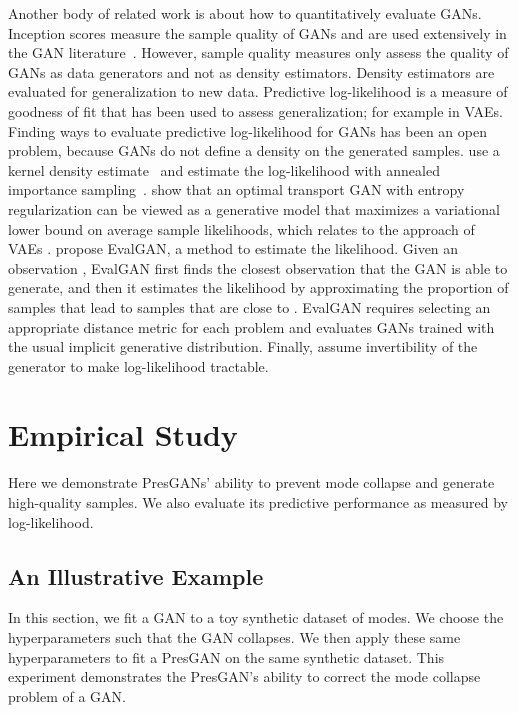 \documentclass[11pt]{article}
\begin{document}
Another body of related work is about how to quantitatively evaluate \glspl{GAN}. Inception scores measure the sample quality of \glspl{GAN} and are used extensively in the \gls{GAN} literature~\citep{salimans2016improved, heusel2017gans, binkowski2018demystifying}. However, sample quality measures only assess the quality of \glspl{GAN} as data generators and not as density estimators. Density estimators are evaluated for generalization to new data. Predictive log-likelihood is a measure of goodness of fit that has been used to assess generalization; for example in \glspl{VAE}. Finding ways to evaluate predictive log-likelihood for \glspl{GAN} has been an open problem, because \glspl{GAN} do not define a density on the generated samples. 
\citet{wu2016quantitative} use a kernel density estimate~\citep{parzen1962estimation} and estimate the log-likelihood with annealed importance sampling~\citep{neal2001annealed}.
\citet{balaji2018entropic} show that an optimal transport \gls{GAN} with entropy regularization can be viewed as a generative model that maximizes a variational lower bound on average sample likelihoods, which relates to the approach of \glspl{VAE} \citep{kingma2013auto}. 
\citet{sanchez2019out} propose Eval\acrshort{GAN}, a method to estimate the likelihood. Given an observation , Eval\acrshort{GAN} first finds the closest observation  that the \gls{GAN} is able to generate, and then it estimates the likelihood  by approximating the proportion of samples  that lead to samples  that are close to . Eval\gls{GAN} requires selecting an appropriate distance metric for each problem and evaluates \glspl{GAN} trained with the usual implicit generative distribution. Finally, \citet{grover2018flow} assume invertibility of the generator to make log-likelihood tractable. 
 
\section{Empirical Study}\label{sec:empirical}

Here we demonstrate Pres\glspl{GAN}' ability to prevent mode collapse and generate high-quality samples. We also evaluate its predictive performance as measured by log-likelihood.

\subsection{An Illustrative Example}
\label{subsec:illustrative}

In this section, we fit a \gls{GAN} to a toy synthetic dataset of  modes. We choose the hyperparameters such that the \gls{GAN} collapses. We then apply these same hyperparameters to fit a Pres\gls{GAN} on the same synthetic dataset. This experiment demonstrates the Pres\gls{GAN}'s ability to correct the mode collapse problem of a \gls{GAN}.
\end{document}
